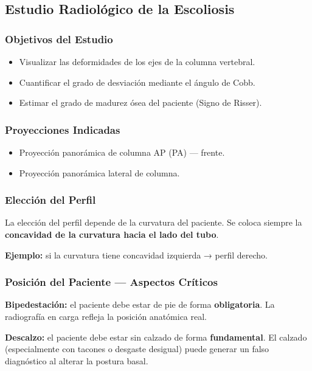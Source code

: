 	
	
	
	\twocolumn
	\clearpage
	\subsection{Estudio Radiológico de la Escoliosis}
	
	\subsubsection*{Objetivos del Estudio}
	\begin{itemize}
		\item Visualizar las deformidades de los ejes de la columna vertebral.
		\item Cuantificar el grado de desviación mediante el ángulo de Cobb.
		\item Estimar el grado de madurez ósea del paciente (Signo de Risser).
	\end{itemize}
	
	\subsubsection*{Proyecciones Indicadas}
	\begin{itemize}
		\item Proyección panorámica de columna AP (PA) — frente.
		\item Proyección panorámica lateral de columna.
	\end{itemize}
	
	\subsubsection*{Elección del Perfil}
	La elección del perfil depende de la curvatura del paciente. Se coloca siempre la \textbf{concavidad de la curvatura hacia el lado del tubo}.
	
	\textbf{Ejemplo:} si la curvatura tiene concavidad izquierda → perfil derecho.
	
	\subsubsection*{Posición del Paciente — Aspectos Críticos}
	
	\textbf{Bipedestación:} el paciente debe estar de pie de forma \textbf{obligatoria}. La radiografía en carga refleja la posición anatómica real.
	
	\textbf{Descalzo:} el paciente debe estar sin calzado de forma \textbf{fundamental}. El calzado (especialmente con tacones o desgaste desigual) puede generar un falso diagnóstico al alterar la postura basal.
	
